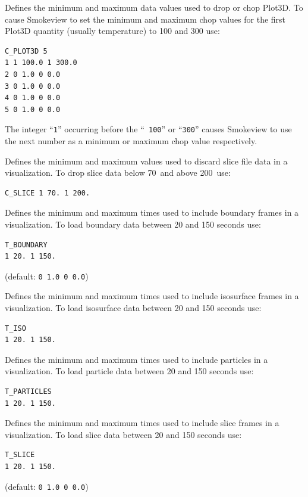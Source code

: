 \documentclass[11pt,twoside]{book}
\newcommand{\hitem}[1]{\item[{\bf #1} \hfill]}
\begin{document}
\hitem{C\_PLOT3D} Defines the minimum and maximum data values used
to drop or chop Plot3D.  To cause Smokeview to set the minimum and
maximum chop values for the first Plot3D quantity (usually
temperature) to 100 and 300 use:

\begin{lstlisting}
C_PLOT3D 5
1 1 100.0 1 300.0
2 0 1.0 0 0.0
3 0 1.0 0 0.0
4 0 1.0 0 0.0
5 0 1.0 0 0.0
\end{lstlisting}

\noindent The integer ``{\tt 1}'' occurring before the ``{\tt
100}'' or ``{\tt 300}'' causes Smokeview to use the next number as
a minimum or maximum chop value respectively.

\hitem{C\_SLICE} Defines the minimum and maximum values used to
discard slice file data in a visualization. To drop slice data
below 70\degC\ and above 200\degC\ use:

\begin{lstlisting}
C_SLICE 1 70. 1 200.
\end{lstlisting}

\hitem{T\_BOUNDARY}Defines the minimum and maximum times
used to include boundary frames in a visualization. To load
boundary data between 20 and 150 seconds use:
\begin{lstlisting}
T_BOUNDARY
1 20. 1 150.
\end{lstlisting}

(default: {\tt 0 1.0 0 0.0})

\hitem{T\_ISO} Defines the minimum and maximum times used
to include isosurface frames in a visualization.  To load
isosurface data between 20 and 150 seconds use:

\begin{lstlisting}
T_ISO
1 20. 1 150.
\end{lstlisting}


\hitem{T\_PARTICLES}Defines the minimum and maximum
times used to include particles in a visualization.
To load particle data between 20 and 150 seconds use:
\begin{lstlisting}
T_PARTICLES
1 20. 1 150.
\end{lstlisting}

\hitem{T\_SLICE}Defines the minimum and maximum times used
to include slice frames in a visualization. To load slice
data between 20 and 150 seconds use:
\begin{lstlisting}
T_SLICE
1 20. 1 150.
\end{lstlisting}

(default: {\tt 0 1.0 0 0.0})
\end{document}

